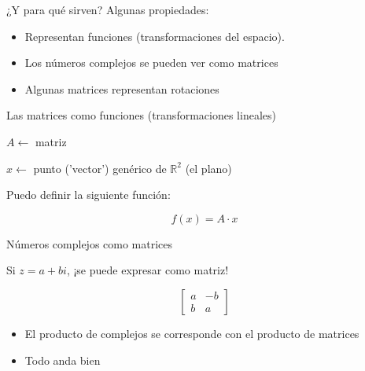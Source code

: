 \documentclass[10pt]{beamer}
\def\R{\mathbb{R}}
\begin{document}
\begin{frame}{¿Y para qué sirven?}
Algunas propiedades:
	\begin{itemize}
		\item Representan funciones (transformaciones del espacio).
		\item Los números complejos se pueden ver como matrices
		\item Algunas matrices representan rotaciones
	\end{itemize}
\end{frame}

\begin{frame}{Las matrices como funciones (transformaciones lineales)}

$ A \leftarrow$ matriz

$ x \leftarrow$ punto ('vector') genérico de $\R^2$ (el plano) \bigskip

Puedo definir la siguiente función:

\Huge $$f(x) = A\cdot x$$





\end{frame}


\begin{frame}{Números complejos como matrices}

Si $z=a+bi$, ¡se puede expresar como matriz! \pause

\[
\begin{bmatrix}
    a  &  -b      \\
    b  &  a      
\end{bmatrix}
\]

\begin{itemize}
	\item El producto de complejos se corresponde con el producto de matrices
	\item Todo anda bien
\end{itemize}
	




	
\end{frame}
\end{document}
